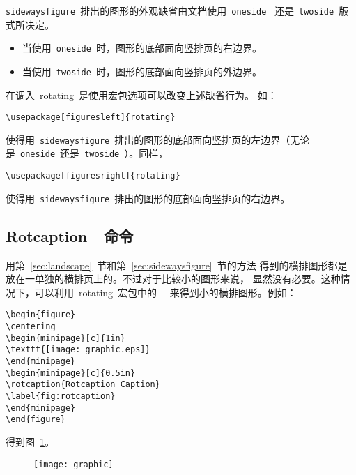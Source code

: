 \texttt{sidewaysfigure}~排出的图形的外观缺省由文档使用~\texttt{oneside}~
还是~\texttt{twoside}~版式所决定。
\begin{itemize}
	\item 当使用~\texttt{oneside}~时，图形的底部面向竖排页的右边界。
	\item 当使用~\texttt{twoside}~时，图形的底部面向竖排页的外边界。
\end{itemize}
在调入~\textsf{rotating}~是使用宏包选项可以改变上述缺省行为。
如：
\begin{Verbatim}[xleftmargin=1cm]
\usepackage[figuresleft]{rotating}
\end{Verbatim}
使得用~\texttt{sidewaysfigure}~排出的图形的底部面向竖排页的左边界（无论
是~\texttt{oneside}~还是~\texttt{twoside}~）。同样，
\begin{Verbatim}[xleftmargin=1cm]
\usepackage[figuresright]{rotating}
\end{Verbatim}
使得用~\texttt{sidewaysfigure}~排出的图形的底部面向竖排页的右边界。

\subsection{Rotcaption~~命令}

用第~\ref{sec:landscape}~节和第~\ref{sec:sidewaysfigure}~节的方法
得到的横排图形都是放在一单独的横排页上的。不过对于比较小的图形来说，
显然没有必要。这种情况下，可以利用~\textsf{rotating}~宏包中的
~~来得到小的横排图形。例如：
\begin{Verbatim}[xleftmargin=1cm]
\begin{figure} 
\centering 
\begin{minipage}[c]{1in} 
\texttt{[image: graphic.eps]}
\end{minipage} 
\begin{minipage}[c]{0.5in} 
\rotcaption{Rotcaption Caption} 
\label{fig:rotcaption} 
\end{minipage} 
\end{figure}
\end{Verbatim}
得到图~\ref{fig:rotcaption}。

\begin{figure} 
	\centering 
	\begin{minipage}[c]{1in}
		\texttt{[image: graphic]}  
	\end{minipage}
	\begin{minipage}[c]{0.5in} 
		\label{fig:rotcaption} 
	\end{minipage}
\end{figure}


